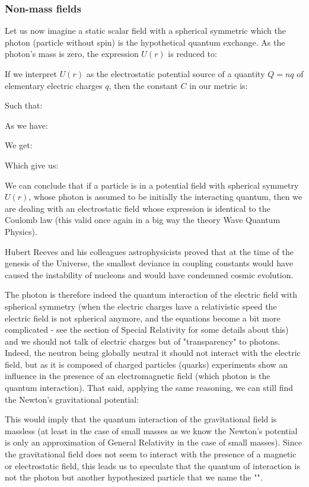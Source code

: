 	
	\subsubsection{Non-mass fields}
	Let us now imagine a static scalar field with a spherical symmetric which the photon (particle without spin) is the hypothetical quantum exchange. As the photon's mass is zero, the expression $U (r)$ is reduced 
to:
	
	If we interpret $U (r)$ as the electrostatic potential source of a quantity $Q=nq$ of elementary electric charges $q$, then the constant $C$ in our metric is:
	
	Such that:
	
	As we have:
	
	We get:
	
	Which give us:
	
	We can conclude that if a particle is in a potential field with spherical symmetry $U (r)$, whose photon is assumed to be initially the interacting quantum, then we are dealing with an electrostatic field whose expression is identical to the Coulomb law (this valid once again in a big way the theory Wave Quantum Physics).
	\begin{tcolorbox}[title=Remark,colframe=black,arc=10pt]
	Hubert Reeves and his colleagues astrophysicists proved that at the time of the genesis of the Universe, the smallest deviance in coupling constants would have caused the instability of nucleons and would have condemned cosmic evolution.
	\end{tcolorbox}
	The photon is therefore indeed the quantum interaction of the electric field with spherical symmetry (when the electric charges have a relativistic speed the electric field is not spherical anymore, and the equations become a bit more complicated - see the section of Special Relativity for some details about this) and we should not talk of electric charges but of "transparency" to photons. Indeed, the neutron being globally neutral it should not interact with the electric field, but as it is composed of charged particles (quarks) experiments show an influence in the presence of an electromagnetic field (which photon is the quantum interaction).
	That said, applying the same reasoning, we can still find the Newton's gravitational potential:
	
	This would imply that the quantum interaction of the gravitational field is massless (at least in the case of small masses as we know the Newton's potential  is only an approximation of General Relativity in the case of small masses). Since the gravitational field does not seem to interact with the presence of a magnetic or electrostatic field, this leads us to speculate that the quantum of interaction is not the photon but another hypothesized particle that we name the "".
	
